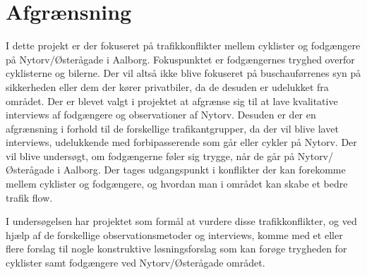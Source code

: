 \section{Afgrænsning}
\label{sec:afgraensning}

I dette projekt er der fokuseret på trafikkonflikter mellem cyklister og fodgængere på Nytorv/Østerågade i Aalborg. Fokuspunktet er fodgængernes tryghed overfor cyklisterne og bilerne. Der vil altså ikke blive fokuseret på buschauførrenes syn på sikkerheden eller dem der kører privatbiler, da de desuden er udelukket fra området. Der er blevet valgt i projektet at afgrænse sig til at lave kvalitative interviews af fodgængere og observationer af Nytorv. Desuden er der en afgrænsning i forhold til de forskellige trafikantgrupper, da der vil blive lavet interviews, udelukkende med forbipasserende som går eller cykler på Nytorv. Der vil blive undersøgt, om fodgængerne føler sig trygge, når de går på Nytorv/Østerågade i Aalborg. Der tages udgangspunkt i konflikter der kan forekomme mellem cyklister og fodgængere, og hvordan man i området kan skabe et bedre trafik flow.

I undersøgelsen har projektet som formål at vurdere disse trafikkonflikter, og ved hjælp af de forskellige observationsmetoder og interviews, komme med et eller flere forslag til nogle konstruktive løsningsforslag som kan forøge trygheden for cyklister samt fodgængere ved Nytorv/Østerågade området.
